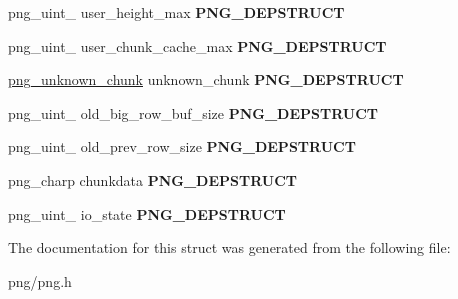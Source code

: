 \begin{DoxyCompactItemize}
\item 
png\+\_\+uint\+\_ user\+\_\+height\+\_\+max {\bfseries P\+N\+G\+\_\+\+D\+E\+P\+S\+T\+R\+U\+CT}\hypertarget{structpng__struct__def_a879c4f7079bca34931af0974c244fb86}{}\label{structpng__struct__def_a879c4f7079bca34931af0974c244fb86}

\item 
png\+\_\+uint\+\_ user\+\_\+chunk\+\_\+cache\+\_\+max {\bfseries P\+N\+G\+\_\+\+D\+E\+P\+S\+T\+R\+U\+CT}\hypertarget{structpng__struct__def_a5a4f409e7884ea875ac0ada356ac20d3}{}\label{structpng__struct__def_a5a4f409e7884ea875ac0ada356ac20d3}

\item 
\hyperlink{structpng__unknown__chunk__t}{png\+\_\+unknown\+\_\+chunk} unknown\+\_\+chunk {\bfseries P\+N\+G\+\_\+\+D\+E\+P\+S\+T\+R\+U\+CT}\hypertarget{structpng__struct__def_ae57e3983c742c075b1c80163bf6cf91c}{}\label{structpng__struct__def_ae57e3983c742c075b1c80163bf6cf91c}

\item 
png\+\_\+uint\+\_ old\+\_\+big\+\_\+row\+\_\+buf\+\_\+size {\bfseries P\+N\+G\+\_\+\+D\+E\+P\+S\+T\+R\+U\+CT}\hypertarget{structpng__struct__def_ae92d8098eb134f3f5d46dc6bdb180862}{}\label{structpng__struct__def_ae92d8098eb134f3f5d46dc6bdb180862}

\item 
png\+\_\+uint\+\_ old\+\_\+prev\+\_\+row\+\_\+size {\bfseries P\+N\+G\+\_\+\+D\+E\+P\+S\+T\+R\+U\+CT}\hypertarget{structpng__struct__def_ae8d4cdbc11ea19db0ae3d0b9851d3e2c}{}\label{structpng__struct__def_ae8d4cdbc11ea19db0ae3d0b9851d3e2c}

\item 
png\+\_\+charp chunkdata {\bfseries P\+N\+G\+\_\+\+D\+E\+P\+S\+T\+R\+U\+CT}\hypertarget{structpng__struct__def_a518824a9c86b21dab24d688af04ea3d7}{}\label{structpng__struct__def_a518824a9c86b21dab24d688af04ea3d7}

\item 
png\+\_\+uint\+\_ io\+\_\+state {\bfseries P\+N\+G\+\_\+\+D\+E\+P\+S\+T\+R\+U\+CT}\hypertarget{structpng__struct__def_afd4582529db9b8a5568f2a9d43f188f6}{}\label{structpng__struct__def_afd4582529db9b8a5568f2a9d43f188f6}

\end{DoxyCompactItemize}


The documentation for this struct was generated from the following file\+:\begin{DoxyCompactItemize}
\item 
png/png.\+h\end{DoxyCompactItemize}
